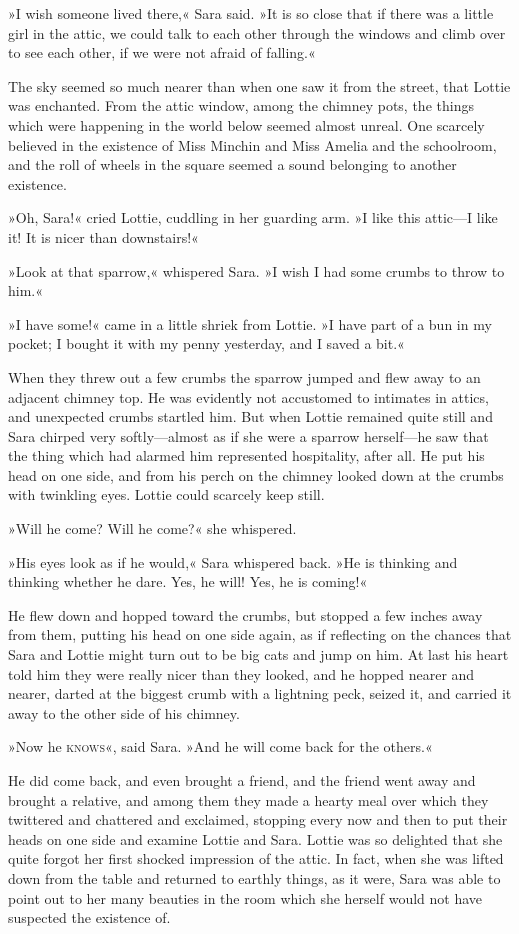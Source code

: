 »I wish someone lived there,« Sara said. »It is so close that if there was a little girl in the attic, we could talk to each other through the windows and climb over to see each other, if we were not afraid of falling.«

The sky seemed so much nearer than when one saw it from the street, that Lottie was enchanted. From the attic window, among the chimney pots, the things which were happening in the world below seemed almost unreal. One scarcely believed in the existence of Miss Minchin and Miss Amelia and the schoolroom, and the roll of wheels in the square seemed a sound belonging to another existence.

»Oh, Sara!« cried Lottie, cuddling in her guarding arm. »I like this attic—I like it! It is nicer than downstairs!«

»Look at that sparrow,« whispered Sara. »I wish I had some crumbs to throw to him.«

»I have some!« came in a little shriek from Lottie. »I have part of a bun in my pocket; I bought it with my penny yesterday, and I saved a bit.«

When they threw out a few crumbs the sparrow jumped and flew away to an adjacent chimney top. He was evidently not accustomed to intimates in attics, and unexpected crumbs startled him. But when Lottie remained quite still and Sara chirped very softly—almost as if she were a sparrow herself—he saw that the thing which had alarmed him represented hospitality, after all. He put his head on one side, and from his perch on the chimney looked down at the crumbs with twinkling eyes. Lottie could scarcely keep still.

»Will he come? Will he come?« she whispered.

»His eyes look as if he would,« Sara whispered back. »He is thinking and thinking whether he dare. Yes, he will! Yes, he is coming!«

He flew down and hopped toward the crumbs, but stopped a few inches away from them, putting his head on one side again, as if reflecting on the chances that Sara and Lottie might turn out to be big cats and jump on him. At last his heart told him they were really nicer than they looked, and he hopped nearer and nearer, darted at the biggest crumb with a lightning peck, seized it, and carried it away to the other side of his chimney.

»Now he \textsc{knows}«, said Sara. »And he will come back for the others.«

He did come back, and even brought a friend, and the friend went away and brought a relative, and among them they made a hearty meal over which they twittered and chattered and exclaimed, stopping every now and then to put their heads on one side and examine Lottie and Sara. Lottie was so delighted that she quite forgot her first shocked impression of the attic. In fact, when she was lifted down from the table and returned to earthly things, as it were, Sara was able to point out to her many beauties in the room which she herself would not have suspected the existence of.

